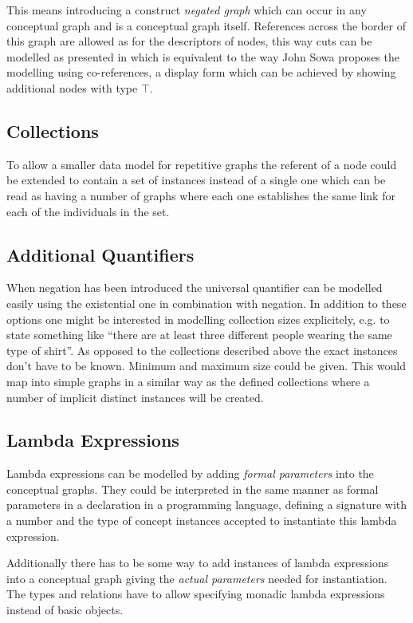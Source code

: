 \documentclass{article}
\newcommand{\defname}{\textit}
\begin{document}
This means introducing a construct \defname{negated graph} which can
occur in any conceptual graph and is a conceptual graph
itself. References across the border of this graph are allowed as for
the descriptors of nodes, this way cuts can be modelled as presented
in \cite{Da00} which is equivalent to the way John Sowa proposes the
modelling using co-references, a display form which can be achieved by
showing additional nodes with type $\top$.

\subsection{Collections}

To allow a smaller data model for repetitive graphs the referent of a
node could be extended to contain a set of instances instead of a
single one which can be read as having a number of graphs where each
one establishes the same link for each of the individuals in the
set.

\subsection{Additional Quantifiers}

When negation has been introduced the universal quantifier can be
modelled easily using the existential one in combination with
negation.  In addition to these options one might be interested in
modelling collection sizes explicitely, e.g. to state something like
``there are at least three different people wearing the same type of
shirt''. As opposed to the collections described above the exact
instances don't have to be known. Minimum and maximum size could be
given. This would map into simple graphs in a similar way as the
defined collections where a number of implicit distinct instances
will be created.

\subsection{Lambda Expressions}
\label{sec:lambdaExpressions}

Lambda expressions can be modelled by adding \defname{formal parameters}
into the conceptual graphs. They could be interpreted in the same manner
as formal parameters in a declaration in a programming language, defining
a signature with a number and the type of concept instances accepted to
instantiate this lambda expression.

Additionally there has to be some way to add instances of lambda
expressions into a conceptual graph giving the \defname{actual
parameters} needed for instantiation. The types and relations have
to allow specifying monadic lambda expressions instead of basic objects.
\end{document}
